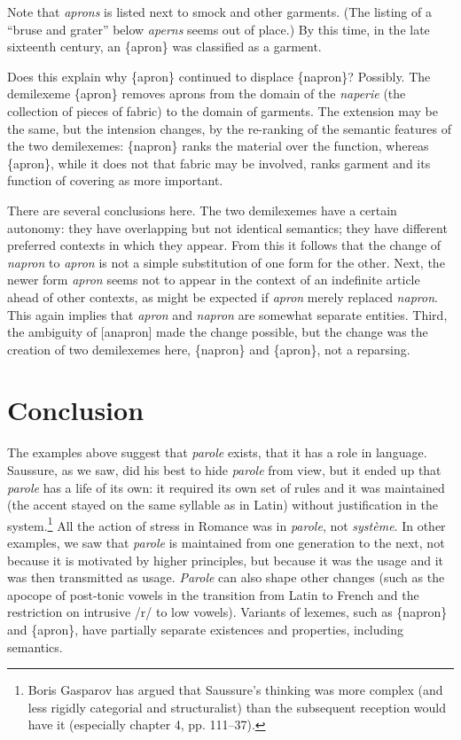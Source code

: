 \documentclass[output=paper,
modfonts
]{LSP/langsci}
\begin{document}
Note that \emph{aprons} is listed next to smock and other garments. (The
listing of a ``bruse and grater'' below \emph{aperns} seems out of
place.) By this time, in the late sixteenth century, an \{apron\} was
classified as a garment.

Does this explain why \{apron\} continued to displace \{napron\}?
Possibly. The demilexeme \{apron\} removes aprons from the domain of the
\emph{naperie} (the collection of pieces of fabric) to the domain of
garments. The extension may be the same, but the intension changes, by
the re-ranking of the semantic features of the two demilexemes:
\{napron\} ranks the material over the function, whereas \{apron\},
while it does not that fabric may be involved, ranks garment and its
function of covering as more important.

There are several conclusions here. The two demilexemes have a certain
autonomy: they have overlapping but not identical semantics; they have
different preferred contexts in which they appear. From this it follows
that the change of \emph{napron} to \emph{apron} is not a simple
substitution of one form for the other. Next, the newer form
\emph{apron} seems not to appear in the context of an indefinite article
ahead of other contexts, as might be expected if \emph{apron} merely
replaced \emph{napron}. This again implies that \emph{apron} and
\emph{napron} are somewhat separate entities. Third, the ambiguity of
{[}anapron{]} made the change possible, but the change was the creation
of two demilexemes here, \{napron\} and \{apron\}, not a reparsing.

\section{Conclusion}\label{conclusion}

The examples above suggest that \emph{parole} exists, that it has a role
in language. Saussure, as we saw, did his best to hide \emph{parole}
from view, but it ended up that \emph{parole} has a life of its own: it
required its own set of rules and it was maintained (the accent stayed
on the same syllable as in Latin) without justification in the
system.\footnote{Boris Gasparov \citeyearpar{gasparov2012} has argued that Saussure's
  thinking was more complex (and less rigidly categorial and
  structuralist) than the subsequent reception would have it (especially
  chapter 4, pp. 111--37).}  All the action of stress in Romance was in
\emph{parole}, not \emph{système}. In other examples, we saw that
\emph{parole} is maintained from one generation to the next, not because
it is motivated by higher principles, but because it was the usage and
it was then transmitted as usage. \emph{Parole} can also shape other
changes (such as the apocope of post-tonic vowels in the transition from
Latin to French and the restriction on intrusive /r/ to low vowels).
Variants of lexemes, such as \{napron\} and \{apron\}, have partially
separate existences and properties, including semantics.
\end{document}

